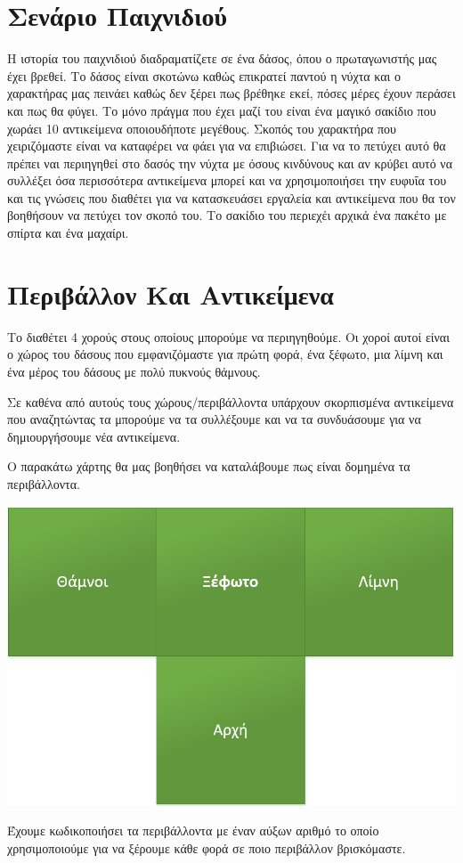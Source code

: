 %
%
\setcounter{section}{0}
\section{Σενάριο Παιχνιδιού}


\noindent
Η ιστορία του παιχνιδιού διαδραματίζετε σε ένα δάσος, όπου ο πρωταγωνιστής
μας έχει βρεθεί. Το δάσος είναι σκοτώνω καθώς επικρατεί παντού η νύχτα και ο 
χαρακτήρας μας πεινάει καθώς δεν ξέρει πως βρέθηκε εκεί, πόσες μέρες έχουν
περάσει και πως θα φύγει. Το μόνο πράγμα που έχει μαζί του είναι ένα μαγικό 
σακίδιο που χωράει 10 αντικείμενα οποιουδήποτε μεγέθους. Σκοπός του χαρακτήρα
που χειριζόμαστε είναι να καταφέρει να φάει για να επιβιώσει. Για να το πετύχει αυτό θα πρέπει ναι περιηγηθεί στο δασός την νύχτα με όσους κινδύνους και αν κρύβει αυτό να συλλέξει όσα περισσότερα αντικείμενα μπορεί και να χρησιμοποιήσει την ευφυΐα του και τις γνώσεις που διαθέτει για να κατασκευάσει εργαλεία και αντικείμενα που θα τον βοηθήσουν να πετύχει τον σκοπό του. Το σακίδιο του περιεχέι αρχικά ένα πακέτο με σπίρτα και ένα μαχαίρι.

\section{Περιβάλλον Και Αντικείμενα}
\noindent
Το διαθέτει 4 χορούς στους οποίους μπορούμε να περιηγηθούμε. Οι χοροί αυτοί είναι ο χώρος του δάσους που εμφανιζόμαστε για πρώτη φορά, ένα ξέφωτο, μια λίμνη και ένα μέρος του δάσους με πολύ πυκνούς θάμνους.

Σε καθένα από αυτούς τους χώρους/περιβάλλοντα  υπάρχουν σκορπισμένα αντικείμενα που αναζητώντας τα μπορούμε να τα συλλέξουμε και να τα συνδυάσουμε για να δημιουργήσουμε νέα αντικείμενα.

Ο παρακάτω χάρτης θα μας βοηθήσει να καταλάβουμε πως είναι δομημένα τα περιβάλλοντα.

\begin{center}
			\includegraphics[width=1\textwidth]{image/1.1.PNG}		
\end{center}
\noindent 
Έχουμε κωδικοποιήσει τα περιβάλλοντα με έναν αύξων αριθμό το οποίο χρησιμοποιούμε για να ξέρουμε κάθε φορά σε ποιο περιβάλλον βρισκόμαστε.

